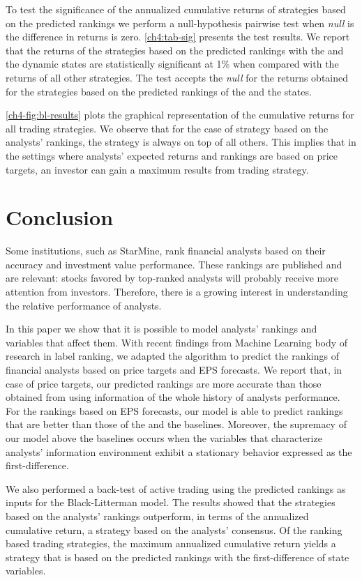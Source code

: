 \documentclass[12pt,a4paper]{article}\usepackage[]{graphicx}\usepackage[]{color}
\begin{document}
To test the significance of the annualized cumulative returns of strategies based on the predicted rankings we perform a null-hypothesis pairwise test when \emph{null} is the difference in returns is zero. \ref{ch4:tab-sig} presents the test results. We report that the returns of the strategies based on the predicted rankings with the \diff{} and the \random{} dynamic states are statistically significant at 1\% when compared with the returns of all other strategies. The test accepts the \emph{null} for the returns obtained for the strategies based on the predicted rankings of the \last{} and the \rollsd{} states.


\ref{ch4-fig:bl-results} plots the graphical representation of the cumulative returns for all  trading strategies. We observe that for the case of strategy based on the analysts' rankings, the \true{} strategy is always on top of all  others. This implies that in the settings where analysts' expected returns and rankings are based on price targets, an investor can gain a maximum results from trading strategy.


\section{Conclusion}
\label{ch4-sec:conclusion}
Some institutions, such as StarMine, rank financial analysts based on their accuracy and investment value performance. These rankings are published and are relevant: stocks favored by top-ranked analysts will probably receive more attention from investors. Therefore, there is a growing interest in understanding the relative performance of analysts. 

In this paper we show that it is possible to model analysts' rankings and variables that affect them. With recent findings from Machine Learning body of research in label ranking, we adapted the algorithm to predict the rankings of financial analysts based on price targets and EPS forecasts. We report that, in case of price targets,  our predicted rankings are more accurate than those obtained from using information of  the whole history of analysts performance. For the rankings based on EPS forecasts, our model is able to predict rankings that are better than those of the  and the \naive{} baselines. Moreover, the supremacy of our model above the baselines occurs when  the variables that characterize analysts' information environment exhibit a stationary behavior expressed as the first-difference. 

We also performed a back-test of active trading using the predicted rankings as inputs for the Black-Litterman model. The results showed that the strategies based on the analysts' rankings outperform, in terms of the annualized cumulative return, a  strategy based on the analysts' consensus. Of the ranking based trading strategies, the maximum annualized cumulative return yields  a strategy that is based on the predicted rankings with the first-difference of state variables. 
\end{document}
